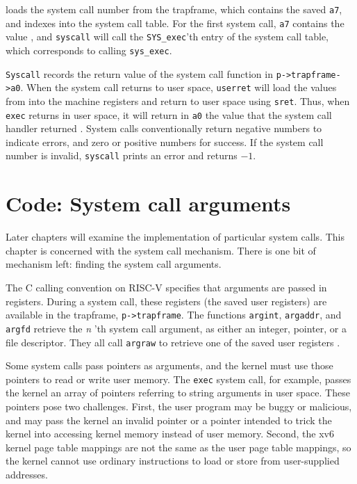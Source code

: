loads the system call number from the trapframe, which
contains the saved
\texttt{a7},
and indexes into the system call table.
For the first system call, 
\texttt{a7}
contains the value 
,
and
\lstinline{syscall}
will call the 
\lstinline{SYS_exec}'th 
entry of the system call table, which corresponds to calling
\lstinline{sys_exec}.

\lstinline{Syscall}
records the return value of the system call function in
\lstinline{p->trapframe->a0}.
When the system call returns to user space,
\lstinline{userret}
will load the values from
into the machine registers
and return to user space
using
\lstinline{sret}.
Thus, when 
\lstinline{exec}
returns in user space, it will return in \lstinline{a0} the value
that the system call handler returned
.
System calls conventionally return negative numbers to indicate
errors, and zero or positive numbers for success.
If the system call number is invalid,
\lstinline{syscall}
prints an error and returns $-1$.

\section{Code: System call arguments}

Later chapters will examine the implementation of
particular system calls.
This chapter is concerned with the system call mechanism.
There is one bit of mechanism left: finding the system call arguments.

The C calling convention on RISC-V specifies that arguments are
passed in registers.
During a system call, these registers (the saved user registers)
are available in the trapframe, {\tt p->trapframe}.
The functions
\lstinline{argint},
\lstinline{argaddr},
and
\lstinline{argfd}
retrieve the 
\textit{n} 'th 
system call
argument, as either an integer, pointer, or a file descriptor.
They all call {\tt argraw} to retrieve one of the saved
user registers
.

Some system calls pass pointers as arguments, and the kernel must use
those pointers to read or write user memory. The {\tt exec} system
call, for example, passes the kernel an array of pointers
referring to string arguments in user space.
These pointers pose
two challenges. First, the user program may be buggy or malicious, and
may pass the kernel an invalid pointer or a pointer intended to trick
the kernel into accessing kernel memory instead of user memory.
Second, the xv6 kernel page table mappings are not the same as the
user page table mappings, so the kernel cannot use ordinary
instructions to load or store from user-supplied addresses.

